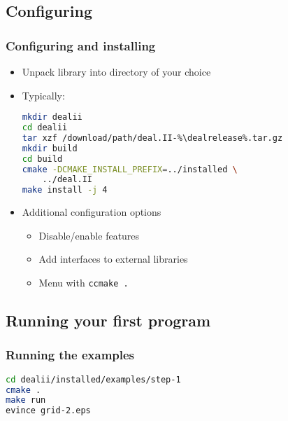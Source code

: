 \subsection{Configuring}

\begin{frame}[fragile]
  \frametitle{Configuring and installing}
  \begin{itemize}
  \item Unpack library into directory of your choice
  \item Typically:
\begin{lstlisting}[language=bash,basicstyle=\ttfamily,keywordstyle=\ttfamily]
mkdir dealii
cd dealii
tar xzf /download/path/deal.II-%\dealrelease%.tar.gz
mkdir build
cd build
cmake -DCMAKE_INSTALL_PREFIX=../installed \
    ../deal.II
make install -j 4
\end{lstlisting}
\item Additional configuration options
    \begin{itemize}
    \item Disable/enable features
    \item Add interfaces to external libraries
    \item Menu with \texttt{ccmake .}
    \end{itemize}
  \end{itemize}
\end{frame}

\subsection{Running your first program}

\begin{frame}[fragile]
  \frametitle{Running the examples}
\begin{lstlisting}[language=bash,basicstyle=\ttfamily,keywordstyle=\ttfamily]
cd dealii/installed/examples/step-1
cmake .
make run
evince grid-2.eps
\end{lstlisting}
\end{frame}


